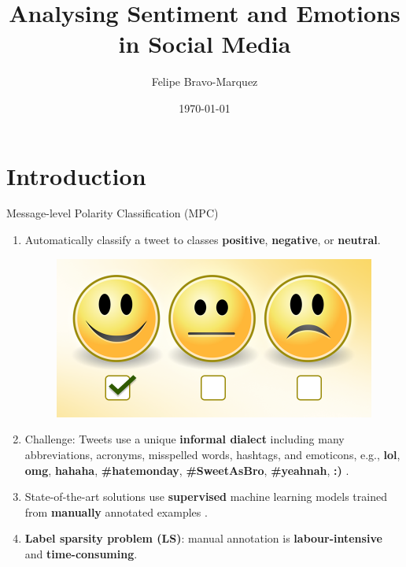 \documentclass[handout]{beamer}
\title{Analysing Sentiment and Emotions in Social Media}
\author[Felipe Bravo Márquez]{\footnotesize
 \textcolor[rgb]{0.00,0.00,1.00}{Felipe Bravo-Marquez}}
\institute{Department of Computer Science, University of Chile }
\date{\today}
\begin{document}
\begin{frame}
\titlepage

\end{frame}

\section{Introduction}


\begin{frame}{Message-level Polarity Classification (MPC)}
\begin{scriptsize}
  \begin{enumerate}
   \item Automatically classify a tweet to classes \textcolor[rgb]{0.00,0.00,1.00}{\textbf{positive}}, \textcolor[rgb]{1.00,0.00,0.00}{\textbf{negative}}, or \textcolor[rgb]{0.00,1.00,0.00}{\textbf{neutral}}. 
   
     \begin{figure}[h]
        	\includegraphics[scale = 0.15]{pics/sent.png}
        \end{figure}
   \item Challenge: Tweets use a unique \textbf{informal dialect} including many abbreviations, acronyms, misspelled words, hashtags, and emoticons, e.g., \textbf{lol}, \textbf{omg}, \textbf{hahaha}, \textbf{\#hatemonday}, \textbf{\#SweetAsBro}, \textbf{\#yeahnah}, \textbf{:)} .
   \item State-of-the-art solutions use \textbf{supervised} machine learning models trained from \textbf{manually} annotated examples \cite{NRCJAIR14}.
   \item \textbf{Label sparsity problem (LS)}: manual annotation is \textbf{labour-intensive} and \textbf{time-consuming}. 
  \end{enumerate} 
\end{scriptsize}

\end{frame}
\end{document}
